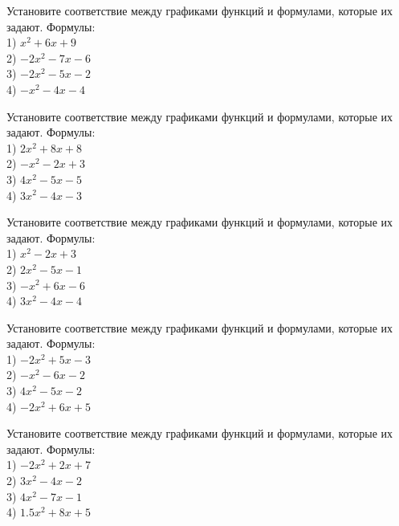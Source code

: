\documentclass[4apaper]{article}
\begin{document}
\begin{taskBN}{37}
Установите соответствие между графиками функций и формулами, которые их задают. Формулы: \\1) $x^2+6x+9$\\2) $-2x^2-7x-6$\\3) $-2x^2-5x-2$\\4) $-x^2-4x-4$
\end{taskBN}

\begin{taskBN}{38}
Установите соответствие между графиками функций и формулами, которые их задают. Формулы: \\1) $2x^2+8x+8$\\2) $-x^2-2x+3$\\3) $4x^2-5x-5$\\4) $3x^2-4x-3$
\end{taskBN}

\begin{taskBN}{39}
Установите соответствие между графиками функций и формулами, которые их задают. Формулы: \\1) $x^2-2x+3$\\2) $2x^2-5x-1$\\3) $-x^2+6x-6$\\4) $3x^2-4x-4$
\end{taskBN}

\begin{taskBN}{40}
Установите соответствие между графиками функций и формулами, которые их задают. Формулы: \\1) $-2x^2+5x-3$\\2) $-x^2-6x-2$\\3) $4x^2-5x-2$\\4) $-2x^2+6x+5$
\end{taskBN}

\begin{taskBN}{41}
Установите соответствие между графиками функций и формулами, которые их задают. Формулы: \\1) $-2x^2+2x+7$\\2) $3x^2-4x-2$\\3) $4x^2-7x-1$\\4) $1.5x^2+8x+5$
\end{taskBN}
\end{document}
